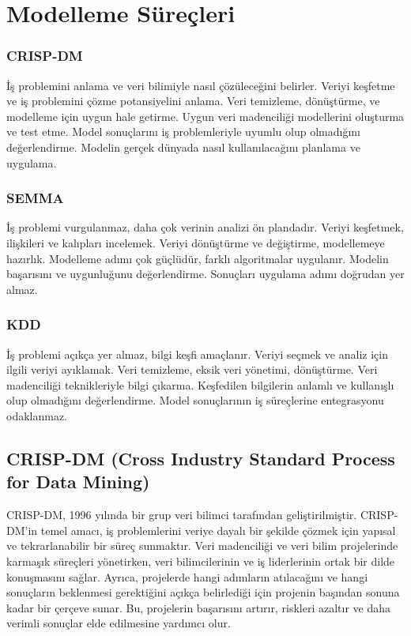 \section{Modelleme Süreçleri}

\subsubsection{CRISP-DM} 

İş problemini anlama ve veri bilimiyle nasıl çözüleceğini belirler. Veriyi keşfetme ve iş problemini çözme potansiyelini anlama. 	Veri temizleme, dönüştürme, ve modelleme için uygun hale getirme. Uygun veri madenciliği modellerini oluşturma ve test etme. Model sonuçlarını iş problemleriyle uyumlu olup olmadığını değerlendirme. Modelin gerçek dünyada nasıl kullanılacağını planlama ve uygulama.

\subsubsection{SEMMA}

İş problemi vurgulanmaz, daha çok verinin analizi ön plandadır. Veriyi keşfetmek, ilişkileri ve kalıpları incelemek. Veriyi dönüştürme ve değiştirme, modellemeye hazırlık. Modelleme adımı çok güçlüdür, farklı algoritmalar uygulanır. Modelin başarısını ve uygunluğunu değerlendirme. Sonuçları uygulama adımı doğrudan yer almaz.

\subsubsection{KDD}

İş problemi açıkça yer almaz, bilgi keşfi amaçlanır. Veriyi seçmek ve analiz için ilgili veriyi ayıklamak. Veri temizleme, eksik veri yönetimi, dönüştürme. Veri madenciliği teknikleriyle bilgi çıkarma. Keşfedilen bilgilerin anlamlı ve kullanışlı olup olmadığını değerlendirme. Model sonuçlarının iş süreçlerine entegrasyonu odaklanmaz.

\newpage

\subsection{CRISP-DM (Cross Industry Standard Process for Data Mining)}

CRISP-DM, 1996 yılında bir grup veri bilimci tarafından geliştirilmiştir. CRISP-DM’in temel amacı, iş problemlerini veriye dayalı bir şekilde çözmek için yapısal ve tekrarlanabilir bir süreç sunmaktır. Veri madenciliği ve veri bilim projelerinde karmaşık süreçleri yönetirken, veri bilimcilerinin ve iş liderlerinin ortak bir dilde konuşmasını sağlar. Ayrıca, projelerde hangi adımların atılacağını ve hangi sonuçların beklenmesi gerektiğini açıkça belirlediği için projenin başından sonuna kadar bir çerçeve sunar. Bu, projelerin başarısını artırır, riskleri azaltır ve daha verimli sonuçlar elde edilmesine yardımcı olur.


